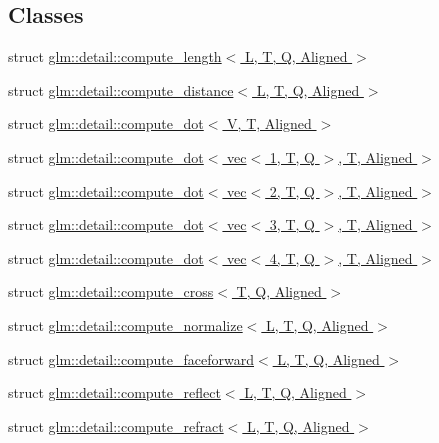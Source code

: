 \subsection*{Classes}
\begin{DoxyCompactItemize}
\item 
struct \hyperlink{structglm_1_1detail_1_1compute__length}{glm\+::detail\+::compute\+\_\+length$<$ L, T, Q, Aligned $>$}
\item 
struct \hyperlink{structglm_1_1detail_1_1compute__distance}{glm\+::detail\+::compute\+\_\+distance$<$ L, T, Q, Aligned $>$}
\item 
struct \hyperlink{structglm_1_1detail_1_1compute__dot}{glm\+::detail\+::compute\+\_\+dot$<$ V, T, Aligned $>$}
\item 
struct \hyperlink{structglm_1_1detail_1_1compute__dot_3_01vec_3_011_00_01T_00_01Q_01_4_00_01T_00_01Aligned_01_4}{glm\+::detail\+::compute\+\_\+dot$<$ vec$<$ 1, T, Q $>$, T, Aligned $>$}
\item 
struct \hyperlink{structglm_1_1detail_1_1compute__dot_3_01vec_3_012_00_01T_00_01Q_01_4_00_01T_00_01Aligned_01_4}{glm\+::detail\+::compute\+\_\+dot$<$ vec$<$ 2, T, Q $>$, T, Aligned $>$}
\item 
struct \hyperlink{structglm_1_1detail_1_1compute__dot_3_01vec_3_013_00_01T_00_01Q_01_4_00_01T_00_01Aligned_01_4}{glm\+::detail\+::compute\+\_\+dot$<$ vec$<$ 3, T, Q $>$, T, Aligned $>$}
\item 
struct \hyperlink{structglm_1_1detail_1_1compute__dot_3_01vec_3_014_00_01T_00_01Q_01_4_00_01T_00_01Aligned_01_4}{glm\+::detail\+::compute\+\_\+dot$<$ vec$<$ 4, T, Q $>$, T, Aligned $>$}
\item 
struct \hyperlink{structglm_1_1detail_1_1compute__cross}{glm\+::detail\+::compute\+\_\+cross$<$ T, Q, Aligned $>$}
\item 
struct \hyperlink{structglm_1_1detail_1_1compute__normalize}{glm\+::detail\+::compute\+\_\+normalize$<$ L, T, Q, Aligned $>$}
\item 
struct \hyperlink{structglm_1_1detail_1_1compute__faceforward}{glm\+::detail\+::compute\+\_\+faceforward$<$ L, T, Q, Aligned $>$}
\item 
struct \hyperlink{structglm_1_1detail_1_1compute__reflect}{glm\+::detail\+::compute\+\_\+reflect$<$ L, T, Q, Aligned $>$}
\item 
struct \hyperlink{structglm_1_1detail_1_1compute__refract}{glm\+::detail\+::compute\+\_\+refract$<$ L, T, Q, Aligned $>$}
\end{DoxyCompactItemize}
